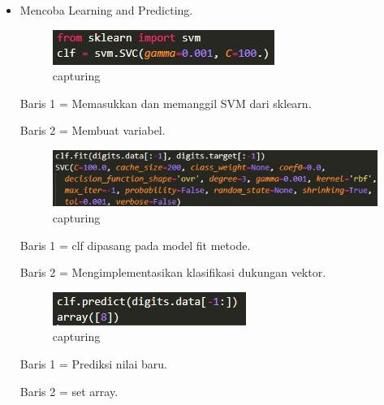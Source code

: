 \begin{itemize}
\item Mencoba Learning and Predicting.

\begin{figure}[ht]
\centering
\includegraphics[scale=0.5]{figures/Capture3.jpg}
\caption{capturing}
\label{loading an example dataset}
\end{figure}

Baris 1 = Memasukkan dan memanggil SVM dari sklearn.

Baris 2 = Membuat variabel.

\begin{figure}[ht]
\centering
\includegraphics[scale=0.5]{figures/Capture4.jpg}
\caption{capturing}
\label{loading an example dataset}
\end{figure}

Baris 1 = clf dipasang pada model fit metode.

Baris 2 = Mengimplementasikan klasifikasi dukungan vektor.

\begin{figure}[ht]
\centering
\includegraphics[scale=0.5]{figures/Capture5.jpg}
\caption{capturing}
\label{loading an example dataset}
\end{figure}

Baris 1 = Prediksi nilai baru.

Baris 2 = set array.

\end{itemize}

